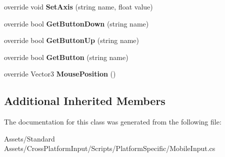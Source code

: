 \begin{DoxyCompactItemize}
\item 
override void {\bfseries Set\+Axis} (string name, float value)\hypertarget{class_unity_standard_assets_1_1_cross_platform_input_1_1_platform_specific_1_1_mobile_input_a62844904d698bdeb2a5305d3ddd1a3f0}{}\label{class_unity_standard_assets_1_1_cross_platform_input_1_1_platform_specific_1_1_mobile_input_a62844904d698bdeb2a5305d3ddd1a3f0}

\item 
override bool {\bfseries Get\+Button\+Down} (string name)\hypertarget{class_unity_standard_assets_1_1_cross_platform_input_1_1_platform_specific_1_1_mobile_input_a8bf6e39ee25d772a7ee72ab9ea04b50b}{}\label{class_unity_standard_assets_1_1_cross_platform_input_1_1_platform_specific_1_1_mobile_input_a8bf6e39ee25d772a7ee72ab9ea04b50b}

\item 
override bool {\bfseries Get\+Button\+Up} (string name)\hypertarget{class_unity_standard_assets_1_1_cross_platform_input_1_1_platform_specific_1_1_mobile_input_aa8563558050d14bdec8b9e1ceae8464c}{}\label{class_unity_standard_assets_1_1_cross_platform_input_1_1_platform_specific_1_1_mobile_input_aa8563558050d14bdec8b9e1ceae8464c}

\item 
override bool {\bfseries Get\+Button} (string name)\hypertarget{class_unity_standard_assets_1_1_cross_platform_input_1_1_platform_specific_1_1_mobile_input_a02d4acfbb8bac5f80d9d7ce07fd72dd0}{}\label{class_unity_standard_assets_1_1_cross_platform_input_1_1_platform_specific_1_1_mobile_input_a02d4acfbb8bac5f80d9d7ce07fd72dd0}

\item 
override Vector3 {\bfseries Mouse\+Position} ()\hypertarget{class_unity_standard_assets_1_1_cross_platform_input_1_1_platform_specific_1_1_mobile_input_ab85ef8caaf3f7346d06f75c22cb98b73}{}\label{class_unity_standard_assets_1_1_cross_platform_input_1_1_platform_specific_1_1_mobile_input_ab85ef8caaf3f7346d06f75c22cb98b73}

\end{DoxyCompactItemize}
\subsection*{Additional Inherited Members}


The documentation for this class was generated from the following file\+:\begin{DoxyCompactItemize}
\item 
Assets/\+Standard Assets/\+Cross\+Platform\+Input/\+Scripts/\+Platform\+Specific/Mobile\+Input.\+cs\end{DoxyCompactItemize}
